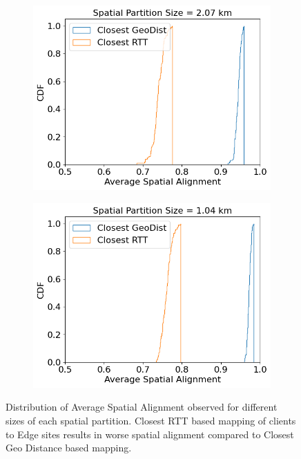 \begin{figure}
\begin{subfigure}{0.45\textwidth}
  \centering
  \includegraphics[width=\linewidth]{figures/mechanisms/spatial_ctx_mgmt/spatial_alignment_randomized_16_rows.png}
  \caption{}
\end{subfigure}%
\begin{subfigure}{0.45\textwidth}
  \centering
  \includegraphics[width=\linewidth]{figures/mechanisms/spatial_ctx_mgmt/spatial_alignment_randomized_32_rows.png}
  \caption{}
\end{subfigure}
\caption{Distribution of Average Spatial Alignment observed for different sizes of each spatial partition. Closest RTT based mapping of clients to Edge sites results in worse spatial alignment compared to Closest Geo Distance based mapping. }
\label{fig:spatial_alignment_eval}
\end{figure}

